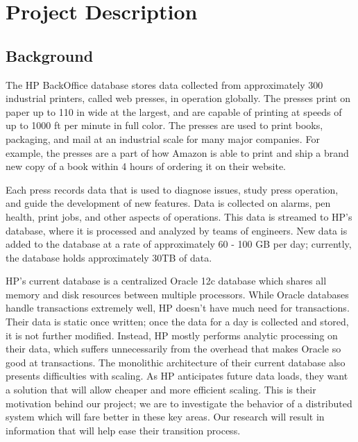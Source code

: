 \documentclass[onecolumn, draftclsnofoot,10pt, compsoc]{IEEEtran}
\begin{document}
\newpage
{}
\tableofcontents
\clearpage

\section{Project Description}
\subsection{Background}
The HP BackOffice database stores data collected from approximately 300 industrial printers, called web presses, in operation globally.
The presses print on paper up to 110 in wide at the largest, and are capable of printing at speeds of up to 1000 ft per minute in full color.
The presses are used to print books, packaging, and mail at an industrial scale for many major companies.
For example, the presses are a part of how Amazon is able to print and ship a brand new copy of a book within 4 hours of ordering it on their website.

Each press records data that is used to diagnose issues, study press operation, and guide the development of new features.
Data is collected on alarms, pen health, print jobs, and other aspects of operations.
This data is streamed to HP's database, where it is processed and analyzed by teams of engineers.
New data is added to the database at a rate of approximately 60 - 100 GB per day; currently, the database holds approximately 30TB of data. 

HP's current database is a centralized Oracle 12c database which shares all memory and disk resources between multiple processors.
While Oracle databases handle transactions extremely well, HP doesn't have much need for transactions. 
Their data is static once written; once the data for a day is collected and stored, it is not further modified.
Instead, HP mostly performs analytic processing on their data, which suffers unnecessarily from the overhead that makes Oracle so good at transactions.
The monolithic architecture of their current database also presents difficulties with scaling.
As HP anticipates future data loads, they want a solution that will allow cheaper and more efficient scaling.
This is their motivation behind our project; we are to investigate the behavior of a distributed system which will fare better in these key areas.
Our research will result in information that will help ease their transition process.
\end{document}
